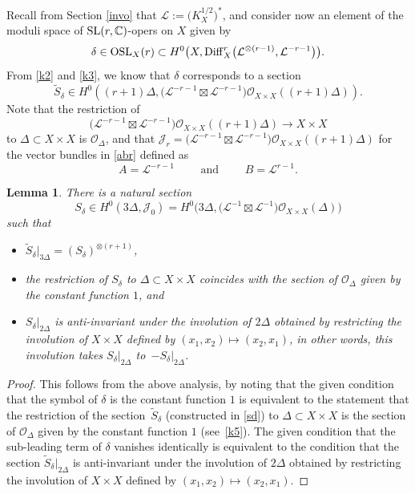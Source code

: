 \documentclass[pdftex]{sigma}
\numberwithin{equation}{section}
\newtheorem{Lemma}[Theorem]{Lemma}
\begin{document}
Recall from Section \ref{invo} that $\mathcal L := \bigl(K^{1/2}_X\bigr)^*$, and consider now an element of the moduli space of
${\rm SL}(r, {\mathbb C})$-opers on $X$ given by
\begin{equation}\label{d1}
\delta \in {\rm OSL}_X(r) \subset
H^0\bigl(X, {\rm Diff}^r_X\bigl({\mathcal L}^{\otimes (r-1)}, {\mathcal L}^{-r-1}\bigr)\bigr).
\end{equation}
From \eqref{k2} and \eqref{k3}, we know that $\delta$ corresponds to a section
\begin{equation}\label{sd}
\widetilde{S}_\delta \in H^0((r+1)\Delta, \bigl({\mathcal L}^{-r-1}\boxtimes {\mathcal L}^{-r-1}\bigr)
{\mathcal O}_{X\times X}((r+1)\Delta)).
\end{equation}
Note that the restriction of
\[
\bigl({\mathcal L}^{-r-1}\boxtimes {\mathcal L}^{-r-1}\bigr){\mathcal O}_{X\times X}((r+1)\Delta)
 \longrightarrow X\times X
\]
to $\Delta \subset X\times X$ is ${\mathcal O}_\Delta$, and that $\mathcal{J}_r =
\bigl({\mathcal L}^{-r-1}\boxtimes {\mathcal L}^{-r-1}\bigr){\mathcal O}_{X\times X}((r+1)\Delta)$ for the vector
bundles in \eqref{abr} defined as
\[A = {\mathcal L}^{-r-1}\qquad \text{ and }\qquad B = {\mathcal L}^{r-1}.\]

\begin{Lemma}
There is a natural section
\[
S_\delta \in H^0(3\Delta, \mathcal{J}_0) = H^0\bigl(3\Delta,
\bigl({\mathcal L}^{-1}\boxtimes {\mathcal L}^{-1}\bigr){\mathcal O}_{X\times X}(\Delta)\bigr)
\]
such that
\begin{itemize}\itemsep=0pt
\item $\widetilde{S}_\delta\big\vert_{3\Delta} = (S_\delta)^{\otimes (r+1)}$,

\item the restriction of $S_\delta$ to $\Delta \subset X\times X$ coincides with the section of
${\mathcal O}_\Delta$ given by the constant function $1$, and

\item $S_\delta\big\vert_{2\Delta}$ is anti-invariant under the involution of $2\Delta$ obtained by restricting
the involution of $X\times X$ defined by $(x_1, x_2) \longmapsto (x_2, x_1)$, in other words, this
involution takes $S_\delta\big\vert_{2\Delta}$ to~$-S_\delta\big\vert_{2\Delta}$.
\end{itemize}
\end{Lemma}

\begin{proof} This follows from the above analysis, by noting that the given condition that the symbol of
$\delta$ is the constant function $1$ is equivalent to the statement that the restriction of the section~$\widetilde{S}_\delta$ (constructed in \eqref{sd}) to $\Delta \subset X\times X$ is the section of
${\mathcal O}_\Delta$ given by the constant function $1$ (see~\eqref{k5}). The given condition that
the sub-leading term of $\delta$ vanishes identically is equivalent to the condition that the section
$\widetilde{S}_\delta\big\vert_{2\Delta}$ is anti-invariant under the involution of $2\Delta$ obtained by restricting
the involution of $X\times X$ defined by $(x_1, x_2) \longmapsto (x_2, x_1)$.
\end{proof}
\end{document}
